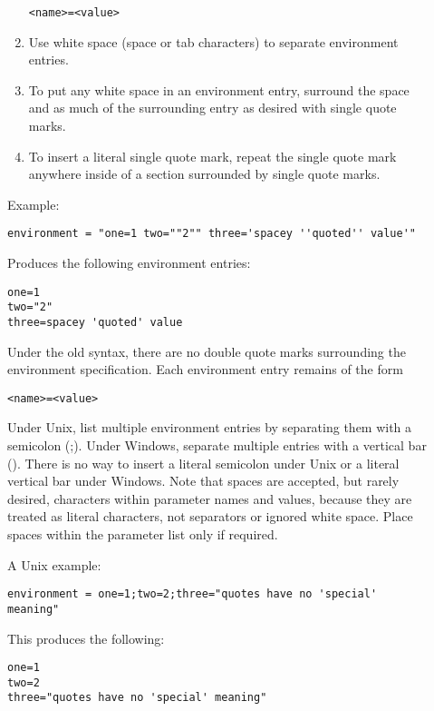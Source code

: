 \begin{description}
\begin{enumerate}
\begin{verbatim}
<name>=<value>
\end{verbatim}

\item Use white space (space or tab characters) to separate environment entries.

\item To put any white space in an environment entry, surround
the space and as much of the surrounding entry as desired with
single quote marks.

\item To insert a literal single quote mark, repeat the single quote mark
anywhere inside of a section surrounded by single quote marks.

\end{enumerate}

Example:

\begin{verbatim}
environment = "one=1 two=""2"" three='spacey ''quoted'' value'"
\end{verbatim}

Produces the following environment entries:

\begin{verbatim}
one=1
two="2"
three=spacey 'quoted' value
\end{verbatim}

Under the old syntax, there are no double quote marks surrounding the
environment specification.  Each environment entry remains of the form
\begin{verbatim}
<name>=<value>
\end{verbatim}
Under Unix, list multiple environment entries by separating them with
a semicolon (;).  Under Windows, separate multiple entries with a
vertical bar (\Bar).  There is no way to insert a literal semicolon
under Unix or a literal vertical bar under Windows.  Note that spaces
are accepted, but rarely desired, characters within parameter names
and values, because they are treated as literal characters, not
separators or ignored white space.  Place spaces within the parameter
list only if required.

A Unix example:

\begin{verbatim}
environment = one=1;two=2;three="quotes have no 'special' meaning"
\end{verbatim}

This produces the following:

\begin{verbatim}
one=1
two=2
three="quotes have no 'special' meaning"
\end{verbatim}


\end{description}
